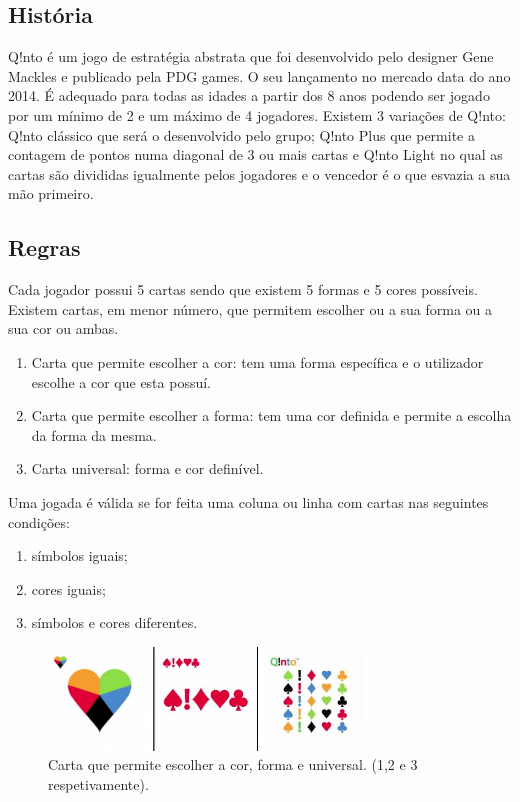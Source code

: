 \documentclass[a4paper]{article}
\begin{document}
\subsection{História}

Q!nto é um jogo de estratégia abstrata que foi desenvolvido pelo designer Gene Mackles e publicado pela PDG games. O seu lançamento no mercado data do ano 2014. É adequado para todas as idades a partir dos 8 anos podendo ser jogado por um mínimo de 2 e um máximo de 4 jogadores. Existem 3 variações de Q!nto: Q!nto clássico que será o desenvolvido pelo grupo; Q!nto Plus que permite a contagem de pontos numa diagonal de 3 ou mais cartas e Q!nto Light no qual as cartas são divididas igualmente pelos jogadores e o vencedor é o que esvazia a sua mão primeiro. 

\subsection{Regras}

Cada jogador possui 5 cartas sendo que existem 5 formas e 5 cores possíveis. Existem cartas, em menor número, que permitem escolher ou a sua forma ou a sua cor ou ambas.

\begin{enumerate}
	\item Carta que permite escolher a cor: tem uma forma específica e o utilizador escolhe a cor que esta possuí. 
	\item Carta que permite escolher a forma: tem uma cor definida e permite a escolha da forma da mesma.
	\item Carta universal: forma e cor definível. 
\end{enumerate}

Uma jogada é válida se for feita uma coluna ou linha com cartas nas seguintes condições:

\begin{enumerate}
	\item símbolos iguais;
	\item cores iguais;
	\item símbolos e cores diferentes.
\end{enumerate}

\begin{figure}[ht!]
\centering
\includegraphics[width=85mm]{especiais.jpg}
\caption{Carta que permite escolher a cor, forma e universal. (1,2 e 3 respetivamente). \label{especiais}}
\end{figure}
\end{document}
